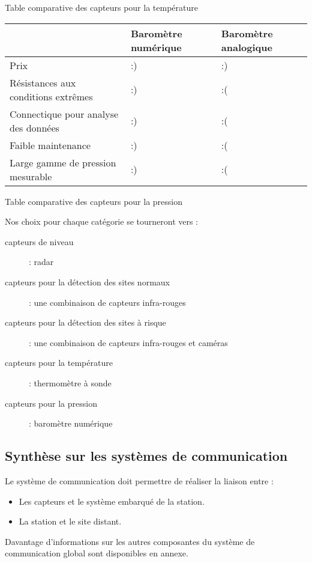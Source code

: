 \documentclass{article}
\begin{document}
Table comparative des capteurs pour la température

\begin{flushleft}
\tablehead{}
\begin{supertabular}{|m{5.303cm}|m{5.303cm}|m{5.339cm}|}
\hline
~
 &
Baromètre numérique &
Baromètre analogique\\\hline
Prix &
:) &
:)\\\hline
Résistances aux conditions extrêmes &
:) &
:(\\\hline
Connectique pour analyse des données &
:) &
:(\\\hline
Faible maintenance &
:) &
:(\\\hline
Large gamme de pression mesurable &
:) &
:(\\\hline
\end{supertabular}
\end{flushleft}

Table comparative des capteurs pour la pression

Nos choix pour chaque catégorie se tourneront vers :

\begin{description}
\item[capteurs de niveau] : radar
\item[capteurs pour la détection des sites normaux] : une combinaison de
capteurs infra-rouges 
\item[capteurs pour la détection des sites à risque] : une combinaison de
capteurs infra-rouges et caméras
\item[capteurs pour la température] : thermomètre à sonde
\item[capteurs pour la pression] : baromètre numérique
\end{description}

\subsection{Synthèse sur les systèmes de communication}
Le système de communication doit permettre de réaliser la liaison entre
:

\begin{itemize}
\item Les capteurs et le système embarqué de la station.
\item La station et le site distant.
\end{itemize}
Davantage d’informations sur les autres composantes du système de
communication global sont disponibles en annexe.
\end{document}
